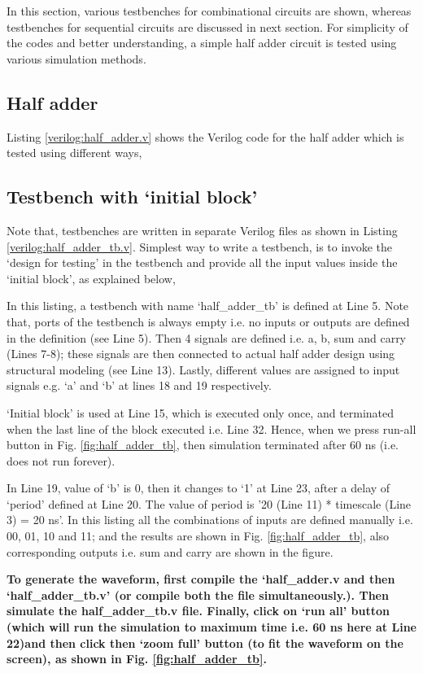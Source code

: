 In this section, various testbenches for combinational circuits are shown, whereas testbenches for sequential circuits are discussed in next section. For simplicity of the codes and better understanding, a simple half adder circuit is tested using various simulation methods. 

\subsection{Half adder}
Listing \ref{verilog:half_adder.v} shows the Verilog code for the half adder which is tested using different ways, 


%
%
\subsection{Testbench with `initial block'}

Note that, testbenches are written in separate Verilog files as shown in Listing \ref{verilog:half_adder_tb.v}. Simplest way to write a testbench, is to invoke the `design for testing' in the testbench and provide all the input values inside the `initial block', as explained below, 

\begin{explanation}
	In this listing, a testbench with name `half\_adder\_tb' is defined at Line 5. Note that, ports of the testbench is always empty i.e. no inputs or outputs are defined in the definition (see Line 5). Then 4 signals are defined i.e. a, b, sum and carry (Lines 7-8); these signals are then connected to actual half adder design using structural modeling (see Line 13). Lastly, different values are assigned to input signals e.g. `a' and `b' at lines 18 and 19 respectively. 
	
	\begin{noNumBox}
		`Initial block' is used at Line 15, which is executed only once, and terminated when the last line of the block executed i.e. Line 32. Hence, when we press run-all button in Fig. \ref{fig:half_adder_tb}, then simulation terminated after 60 ns (i.e. does not run forever). 
	\end{noNumBox}
	In Line 19, value of `b' is 0, then it changes to `1' at Line 23, after a delay of `period' defined at Line 20. The value of period is '20 (Line 11) * timescale (Line 3) = 20 ns'. In this listing all the combinations of inputs are defined manually i.e. 00, 01, 10 and 11; and the results are shown in Fig. \ref{fig:half_adder_tb}, also corresponding outputs i.e. sum and carry are shown in the figure. 
	
	\textbf{To generate the waveform, first compile the `half\_adder.v and then `half\_adder\_tb.v' (or compile both the file simultaneously.). Then simulate the half\_adder\_tb.v file. Finally, click on `run all' button (which will run the simulation to maximum time i.e. 60 ns here at Line 22)and then click then `zoom full' button (to fit the waveform on the screen), as shown in Fig. \ref{fig:half_adder_tb}.}
\end{explanation}

